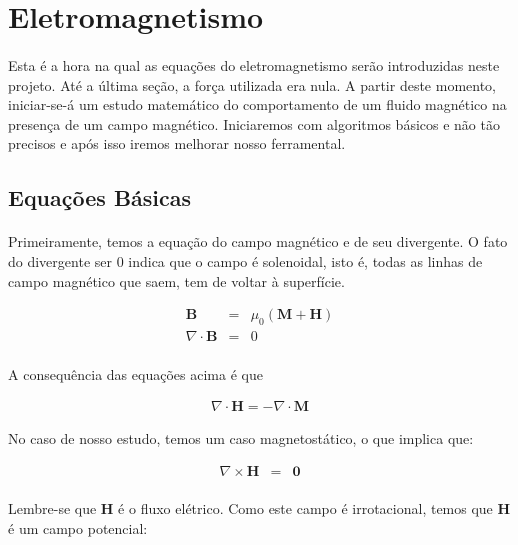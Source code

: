 \documentclass[eletromagnetismo.tex]{subfiles}
\begin{document}
\section{Eletromagnetismo}

\paragraph{} Esta é a hora na qual as equações do eletromagnetismo serão introduzidas neste projeto. Até a última seção, a força utilizada era nula. A partir deste momento, iniciar-se-á um estudo matemático do comportamento de um fluido magnético na presença de um campo magnético. Iniciaremos com algoritmos básicos e não tão precisos e após isso iremos melhorar nosso ferramental. 

\subsection{Equações Básicas}

\paragraph{} Primeiramente, temos a equação do campo magnético e de seu divergente. O fato do divergente ser 0 indica que o campo é solenoidal, isto é, todas as linhas de campo magnético que saem, tem de voltar à superfície.

\begin{eqnarray}
\mathbf{B} &=& \mu_0(\mathbf{M}+\mathbf{H})\\
\nabla\cdot \mathbf{B} & = & 0
\end{eqnarray}

\paragraph{} A consequência das equações acima é que 

\begin{eqnarray}
\nabla\cdot\mathbf{H} = -\nabla\cdot \mathbf{M}	\label{mh1}
\end{eqnarray}


No caso de nosso estudo, temos um caso magnetostático, o que implica que:

\begin{eqnarray}
\nabla\times \mathbf{H} & = & \mathbf{0}
\end{eqnarray}

\paragraph{} Lembre-se que $\mathbf{H}$ é o fluxo elétrico. Como este campo é irrotacional, temos que $\mathbf{H}$ é um campo potencial:
\end{document}
